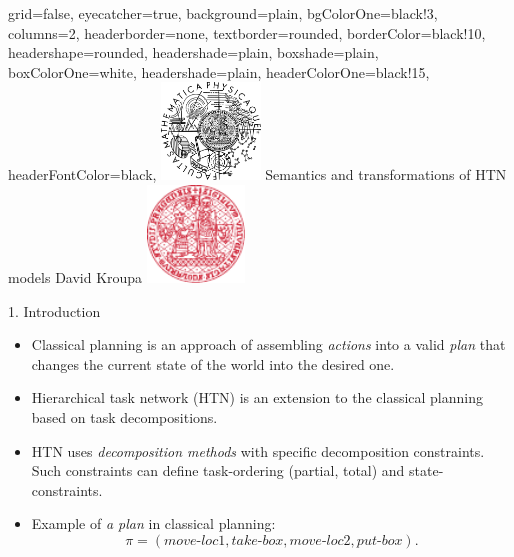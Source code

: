 \documentclass[portrait,a0paper,fontscale=0.25]{baposter}
\begin{document}
\color{black!80} %
\begin{poster}{grid=false,
	eyecatcher=true,
	background=plain,
	bgColorOne=black!3, %
	columns=2,
	headerborder=none,
        textborder=rounded, %
        borderColor=black!10,
	headershape=rounded, %
	headershade=plain,
	boxshade=plain,
	boxColorOne=white,
	headershade=plain,
	headerColorOne=black!15, %
	headerFontColor=black,
	}%
	{\includegraphics[height=7em]{logos/mff-black.pdf}}
	{Semantics and transformations of HTN models}
	{\vspace{1ex} David Kroupa}
	{\includegraphics[height=7em]{logos/uk-red.pdf}}


%
%

\begin{posterbox}[column=0,name=intro]{1. Introduction}

\begin{itemize}
    \item Classical planning is an approach of assembling \emph{actions} into a valid \emph{plan} that changes the current state of the world into the desired one.

    \item Hierarchical task network (HTN) is an extension to the classical planning based on task decompositions.

    \item HTN uses \emph{decomposition methods} with specific decomposition constraints. Such constraints can define task-ordering (partial, total) and state-constraints.
\end{itemize}

\begin{itemize}
    \item Example of \emph{a plan} in classical planning:
    $$ \pi = (move\text{-}loc1, take\text{-}box, move\text{-}loc2, put\text{-}box). $$
    

\end{itemize}
\end{posterbox}
\end{poster}
\end{document}
